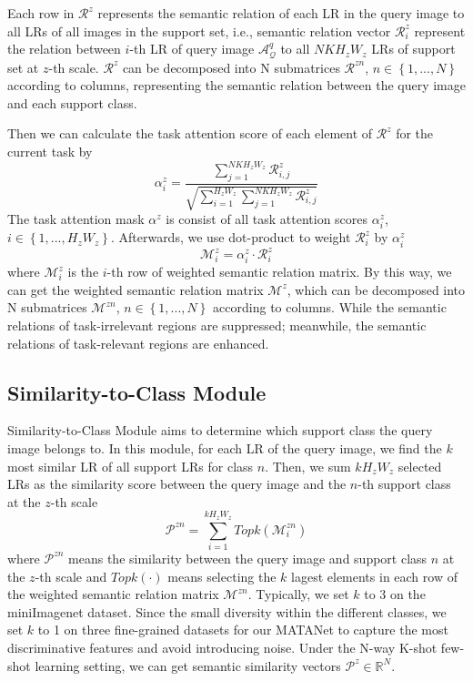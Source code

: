 \documentclass[final]{cvpr}
\begin{document}
	Each row in $\mathcal{R}^z$ represents the semantic relation of each LR in the query image to all LRs of all images in the support set, i.e., semantic relation vector  $\mathcal{R}^z_i$ represent the relation between $i$-th LR of query image $\mathcal{A}^q_\mathcal{Q}$ to all $NKH_zW_z$ LRs of support set at $z$-th scale. $\mathcal{R}^z$ can be decomposed into N submatrices $\mathcal{R}^{zn}$, $n\in\left\{1,...,N\right\}$ according to columns, representing the semantic relation between the query image and each support class. 
	
	Then we can calculate the task attention score of each element of $\mathcal{R}^z$ for the current task by
	\begin{equation} 
		\alpha^z_i = \frac{
			\sum_{j=1}^{NKH_zW_z}\mathcal{R}^z_{i,j}
		}{
			\sqrt{\sum_{i=1}^{H_zW_z}\sum_{j=1}^{NKH_zW_z}\mathcal{R}^z_{i,j} }}
	\end{equation}
	The task attention mask $\alpha^z$  is consist of all task attention scores $\alpha^z_i$, $i\in\left\{1,...,H_zW_z\right\}$. Afterwards, we use dot-product to weight $\mathcal{R}^z_i$ by $\alpha^z_i$
	\begin{equation} 
		\mathcal{M}^z_i =
		\alpha^z_i \cdot \mathcal{R}^z_i
	\end{equation}
	where $\mathcal{M}^z_i$ is the $i$-th row of weighted semantic relation matrix. By this way, we can get the weighted semantic relation matrix $\mathcal{M}^z$, which can be decomposed into N submatrices $\mathcal{M}^{zn}$, $n\in\left\{1,...,N\right\}$ according to columns. While the semantic relations of task-irrelevant regions are suppressed; meanwhile, the semantic relations of task-relevant regions are enhanced. 
	
	\subsection{Similarity-to-Class Module}
	Similarity-to-Class Module aims to determine which support class the query image belongs to. In this module, for each LR of the query image, we find the $k$ most similar LR of all support LRs for class $n$. Then, we sum $kH_zW_z$ selected LRs as the similarity score between the query image and the $n$-th support class at the $z$-th scale
	\begin{equation} 	
		\mathcal{P}^{zn}  = \sum_{i=1}^{kH_zW_z}Topk(\mathcal{M}^{zn}_i)	
	\end{equation}
	where $\mathcal{P}^{zn}$ means the similarity between the query image and support class $n$ at the $z$-th scale and $Topk (\cdot)$ means selecting the $k$ lagest elements in each row of the weighted semantic relation matrix $\mathcal{M}^{zn}$. 
	Typically, we set $k$ to 3 on the miniImagenet dataset. 
	Since the small diversity within the different classes, we set $k$ to 1 on three fine-grained datasets for our MATANet to capture the most discriminative features and avoid introducing noise.
	Under the N-way K-shot few-shot learning setting, we can get semantic similarity vectors $\mathcal{P}^z\in\mathbb{R}^N$.
	
\end{document}
